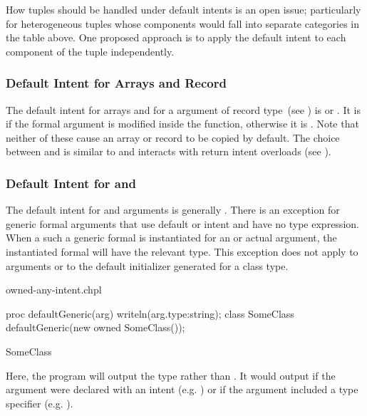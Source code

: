 \begin{openissue}
How tuples should be handled under default intents is an open issue;
particularly for heterogeneous tuples whose components would fall into
separate categories in the table above.  One proposed approach is to
apply the default intent to each component of the tuple independently.
\end{openissue}

\subsubsection{Default Intent for Arrays and Record }
\label{Default_Intent_for_Arrays_and_Record_this}

The default intent for arrays and for a  argument of record
type~(see ) is  or . It is  if the formal argument is modified inside the
function, otherwise it is .  Note that neither of these
cause an array or record to be copied by default.  The choice between
 and  is similar to and interacts with return
intent overloads (see ).

\subsubsection{Default Intent for  and }
\label{Default_Intent_for_owned_and_shared}

The default intent for  and  arguments is
generally . There is an exception for generic formal arguments
that use default or  intent and have no type expression.
When a such a generic formal is instantiated for an  or
 actual argument, the instantiated formal will have the
relevant  type. This exception does not apply to 
arguments or to the default initializer generated for a class type.

\begin{chapelexample}{owned-any-intent.chpl}
\begin{chapel}
proc defaultGeneric(arg) {
  writeln(arg.type:string);
}
class SomeClass { }
defaultGeneric(new owned SomeClass());
\end{chapel}
\begin{chapeloutput}
SomeClass
\end{chapeloutput}
Here, the program will output the type  rather
than . It would output  if
the argument were declared with an  intent (e.g. ) or if
the argument included a type specifier (e.g. ).
\end{chapelexample}


